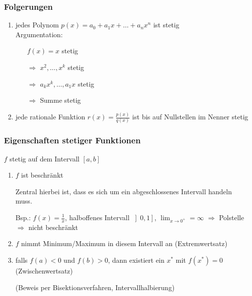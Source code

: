 \subsubsection*{Folgerungen}

  \begin{enumerate}
    \item jedes Polynom $p(x) = a_0 + a_1 x + \ldots + a_n x^n$ ist stetig\\
      Argumentation:
      \begin{itemize}
        \item[] $f(x) = x$ stetig
        \item[$\Rightarrow$] $x^2, \ldots, x^k$ stetig
        \item[$\Rightarrow$] $a_k x^k, \ldots, a_1 x$ stetig
        \item[$\Rightarrow$] Summe stetig
      \end{itemize}
    \item jede rationale Funktion $r(x) = \frac{p(x)}{q(x)}$ ist bis auf Nullstellen im Nenner stetig
  \end{enumerate}

\subsubsection*{Eigenschaften stetiger Funktionen}

$f$ stetig auf dem Intervall $\left[a,b\right]$
  \begin{enumerate}
    \item $f$ ist beschränkt
      \begin{note}
        Zentral hierbei ist, dass es sich um ein abgeschlossenes Intervall handeln muss.

        Bsp.: $f(x) = \frac 1 x$, halboffenes Intervall $\left]0,1\right]$, $\displaystyle\lim_{x\rightarrow 0^+} = \infty$ $\Rightarrow$ Polstelle $\Rightarrow$ nicht beschränkt
      \end{note}
    \item $f$ nimmt Minimum/Maximum in diesem Intervall an (Extremwertsatz)
    \item falls $f(a) < 0$ und $f(b) > 0$, dann existiert ein $x^\ast$ mit $f(x^\ast) = 0$ (Zwischenwertsatz)
    
      (Beweis per Bisektionsverfahren, Intervallhalbierung)
  \end{enumerate}
\begin{center}
\end{center}


